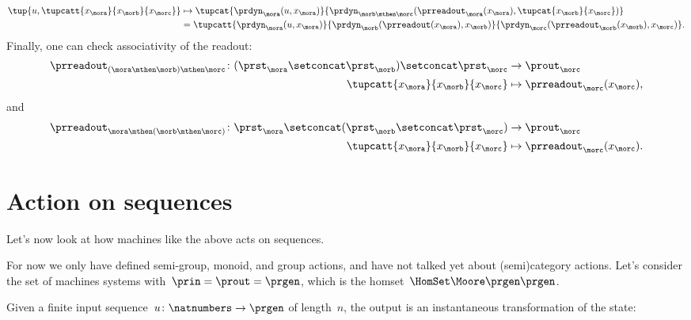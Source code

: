\begin{solution}
\begin{equation*}
\begin{aligned}
            \tup{u, \tupcatt{x_{\mora}}{x_{\morb}}{x_\morc}}&\mapsto \tupcat{\prdyn_{\mora}(u,x_\mora)}{\prdyn_{\morb\mthen \morc}(\prreadout_{\mora}(x_\mora),\tupcat{x_\morb}{x_\morc})}\\
            &=\tupcatt{\prdyn_\mora(u,x_\mora)}{\prdyn_\morb(\prreadout(x_\mora),x_\morb)}{\prdyn_\morc(\prreadout_\morb(x_\morb),x_\morc)}.
        \end{aligned}
    \end{equation*}
    Finally, one can check associativity of the readout:
    \begin{equation*}
        \label{eq:assoc_moore_3}
        \begin{aligned}
            \prreadout_{(\mora \mthen \morb)\mthen \morc}\colon (\prst_\mora \setconcat \prst_\morb)\setconcat \prst_\morc &\to \prout_\morc\\
            \tupcatt{x_\mora}{x_\morb}{x_\morc} &\mapsto \prreadout_\morc(x_\morc),
        \end{aligned}
    \end{equation*}
    and
    \begin{equation*}
        \label{eq:assoc_moore_4}
        \begin{aligned}
            \prreadout_{\mora \mthen (\morb\mthen \morc)}\colon \prst_\mora \setconcat (\prst_\morb\setconcat \prst_\morc) &\to \prout_\morc\\
            \tupcatt{x_\mora}{x_\morb}{x_\morc} &\mapsto \prreadout_\morc(x_\morc).
        \end{aligned}
    \end{equation*}
\end{solution}



\section{Action on sequences}

Let's now look at how machines like the above acts on sequences.

For now we only have defined semi-group, monoid, and group actions, and have not talked yet about (semi)category actions.
Let's consider the set of machines systems with~$\prin = \prout = \prgen$, which is the homset~$\HomSet\Moore\prgen\prgen$.

Given a finite input sequence~$u\colon \natnumbers \to \prgen$ of length~$n$, the output is an instantaneous transformation of the state:

